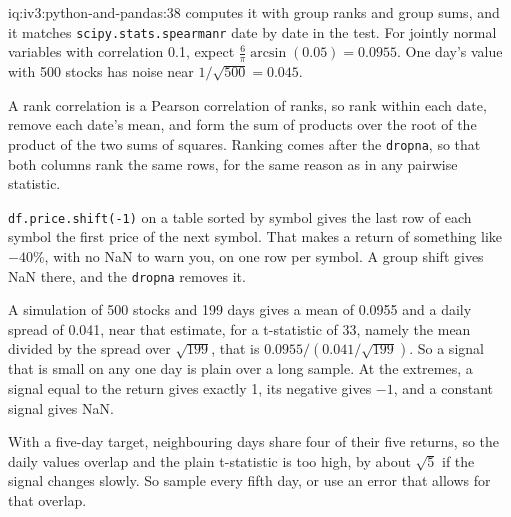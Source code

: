 \begin{solution}{iq:iv3:python-and-pandas:38}
 computes it with group ranks and group sums, and it matches \texttt{scipy.stats.spearmanr} date by date in the test. For jointly normal variables with correlation 0.1, expect $\frac{6}{\pi} \arcsin(0.05) = 0.0955$. One day's value with 500 stocks has noise near $1 / \sqrt{500} = 0.045$.
\label{lst:iv3:pp:ic}

A rank correlation is a Pearson correlation of ranks, so rank within each date, remove each date's mean, and form the sum of products over the root of the product of the two sums of squares. Ranking comes after the \texttt{dropna}, so that both columns rank the same rows, for the same reason as in any pairwise statistic.

\texttt{df.price.shift(-1)} on a table sorted by symbol gives the last row of each symbol the first price of the next symbol. That makes a return of something like $-40\%$, with no NaN to warn you, on one row per symbol. A group shift gives NaN there, and the \texttt{dropna} removes it.

A simulation of 500 stocks and 199 days gives a mean of 0.0955 and a daily spread of 0.041, near that estimate, for a t-statistic of 33, namely the mean divided by the spread over $\sqrt{199}$, that is $0.0955 / (0.041 / \sqrt{199})$. So a signal that is small on any one day is plain over a long sample. At the extremes, a signal equal to the return gives exactly 1, its negative gives $-1$, and a constant signal gives NaN.

With a five-day target, neighbouring days share four of their five returns, so the daily values overlap and the plain t-statistic is too high, by about $\sqrt{5}$ if the signal changes slowly. So sample every fifth day, or use an error that allows for that overlap.

\end{solution}

